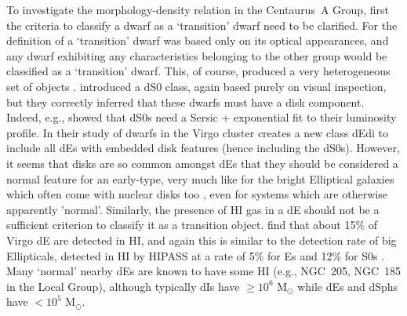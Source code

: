 \documentclass[preprint]{aastex}
\begin{document}
To investigate the morphology-density relation in the Centaurus~A Group,
first the criteria to classify a dwarf as a `transition' dwarf need to be 
clarified. For \citet{sh91} the definition of a
`transition' dwarf was based only on its optical appearances, and any dwarf
exhibiting any characteristics belonging to the other group would be classified
as a `transition' dwarf. This, of course, produced a very
heterogeneous set of objects \citep{ksg99}. \citet{sb84} introduced
a dS0 class, again based purely on visual inspection, but they correctly
inferred that these dwarfs must have a disk component. Indeed, e.g., \citet{aivms05}
showed that dS0s need a Sersic + exponential fit to their 
luminosity profile. In their study of dwarfs in the Virgo cluster \citet{lgwg06} 
creates a new class dEdi to include all dEs with embedded disk features
(hence including the dS0s). However, it seems that disks are so common amongst
dEs that they should be considered a normal feature for an early-type, very much 
like for the bright Elliptical galaxies which often come with 
nuclear disks too \citet{cpf06}, even for systems which are otherwise apparently 'normal'.
Similarly, the presence of HI gas in a dE should not be a sufficient criterion
to classify it as a transition object. \citet{cogw03} find that about 15\%
of Virgo dE are detected in HI, and again this is similar to the detection rate
of big Ellipticals, detected in HI by HIPASS at a rate of 5\%
for Es and 12\% for S0s \citep{s01}. Many `normal' nearby dEs are known to
have some HI (e.g., NGC~205, NGC~185 in the Local Group), although typically dIs
have $\geq 10^{6}$ M$_\odot $ while dEs and dSphs have $< 10^{5}$ M$_\odot $.
\end{document}
